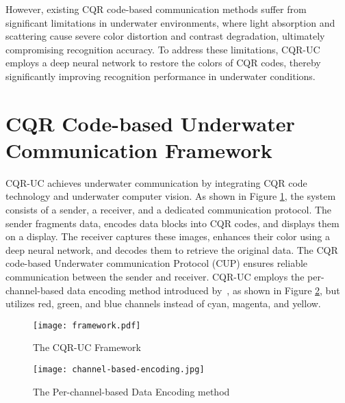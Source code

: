 \documentclass[preprint,12pt]{elsarticle}
\begin{document}
However, existing CQR code-based communication methods suffer from significant limitations in underwater environments, where light absorption and scattering cause severe color distortion and contrast degradation, ultimately compromising recognition accuracy. To address these limitations, CQR-UC employs a deep neural network to restore the colors of CQR codes, thereby significantly improving recognition performance in underwater conditions.

\section{CQR Code-based Underwater Communication Framework}

CQR-UC achieves underwater communication by integrating CQR code technology and underwater computer vision. As shown in Figure \ref{fig:framework}, the system consists of a sender, a receiver, and a dedicated communication protocol. The sender fragments data, encodes data blocks into CQR codes, and displays them on a display. The receiver captures these images, enhances their color using a deep neural network, and decodes them to retrieve the original data. The CQR code-based Underwater communication Protocol (CUP) ensures reliable communication between the sender and receiver. CQR-UC employs the per-channel-based data encoding method introduced by~\cite{blasinski2013Image}, as shown in Figure \ref{fig:encoding}, but utilizes red, green, and blue channels instead of cyan, magenta, and yellow.

\begin{figure}[H]
\centering
    \texttt{[image: framework.pdf]}
    \caption{The CQR-UC Framework}
    \label{fig:framework}
\end{figure}
\begin{figure}[H]
\centering
    \texttt{[image: channel-based-encoding.jpg]}
    \caption{The Per-channel-based Data Encoding method~\cite{blasinski2013Image}}
    \label{fig:encoding}
\end{figure}
\end{document}
